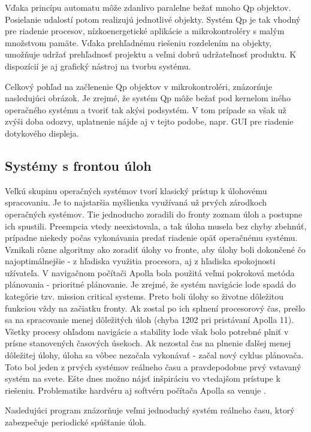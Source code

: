 Vďaka princípu automatu môže zdanlivo paralelne bežať mnoho Qp objektov. Posielanie udalostí potom realizujú jednotlivé objekty. Systém Qp je tak vhodný pre riadenie procesov, nízkoenergetické aplikácie a mikrokontroléry s malým množstvom pamäte. Vďaka prehľadnému riešeniu rozdelením na objekty, umožňuje udržať prehľadnosť projektu a veľmi dobrú udržateľnosť produktu. K dispozícií je aj grafický nástroj na tvorbu systému.

Celkový pohľad na začlenenie Qp objektov v mikrokontroléri, znázorńuje nasledujúci obrázok. Je zrejmé, že systém Qp môže bežať pod kernelom iného operačného systému a tvoriť tak akýsi podsystém. V tom prípade sa však už zvýši doba odozvy, uplatnenie nájde aj v tejto podobe, napr. GUI pre riadenie dotykového displeja.

\subsection{Systémy s frontou úloh}

Veľkú skupinu operačných systémov tvorí klasický prístup k úlohovému spracovaniu. Je to najstaršia myšlienka využívaná už prvých zárodkoch operačných systémov. Tie jednoducho zoradili do fronty zoznam úloh a postupne ich spustili. Preempcia vtedy neexistovala, a tak úloha musela bez chyby zbehnúť, prípadne niekedy počas vykonávania predať riadenie opäť operačnému systému. Vznikali rôzne algoritmy ako zoradiť úlohy vo fronte, aby úlohy boli dokončené čo najoptimálnejšie - z hľadiska využitia procesora, aj z hľadiska spokojnosti užívateľa.
V navigačnom počítači Apolla bola použitá veľmi pokroková metóda plánovania - prioritné plánovanie. Je zrejmé, že systém navigácie lode spadá do kategórie tzv. mission critical systems. Preto boli úlohy so životne dôležitou funkciou vždy na začiatku fronty. Ak zostal po ich splnení procesorový čas, prešlo sa na spracovanie menej dôležitých úloh (chyba 1202 pri pristávaní Apolla 11). Všetky procesy ohľadom navigácie a stability lode však bolo potrebné plniť v prísne stanovených časových úsekoch. Ak nezostal čas na plnenie ďalšej menej dôležitej úlohy, úloha sa vôbec nezačala vykonávať - začal nový cyklus plánovača. Toto bol jeden z prvých systémov reálneho času a pravdepodobne prvý vstavaný systém na svete. Ešte dnes možno nájsť inšpiráciu vo vtedajšom prístupe k riešeniu. Problematike hardvéru aj softvéru počítača Apolla sa venuje \cite{apollo_agc}.

Nasledujúci program znázorňuje veľmi jednoduchý systém reálneho času, ktorý zabezpečuje periodické spúšťanie úloh.


